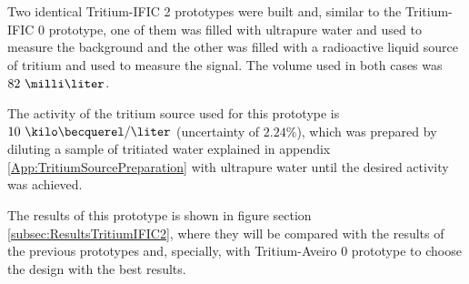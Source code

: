 Two identical Tritium-IFIC 2 prototypes were built and, similar to the Tritium-IFIC 0 prototype, one of them was filled with ultrapure water and used to measure the background and the other was filled with a radioactive liquid source of tritium and used to measure the signal. The volume used in both cases was $82~\milli\liter$.

The activity of the tritium source used for this prototype is $10~\kilo\becquerel/\liter$ (uncertainty of $2.24\%$), which was prepared by diluting a sample of tritiated water explained in appendix \ref{App:TritiumSourcePreparation} with ultrapure water until the desired activity was achieved.

The results of this prototype is shown in figure section \ref{subsec:ResultsTritiumIFIC2}, where they will be compared with the results of the previous prototypes and, specially, with Tritium-Aveiro 0 prototype to choose the design with the best results.